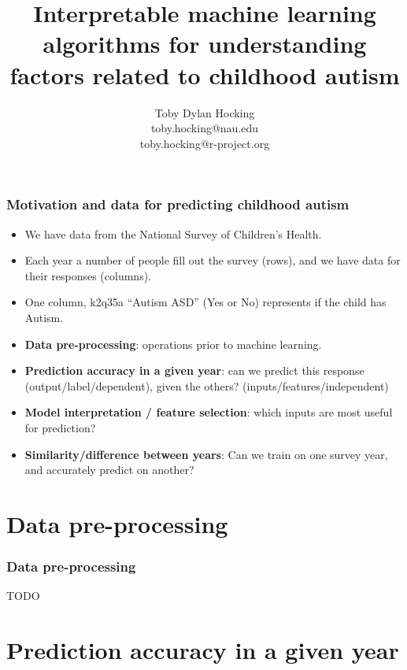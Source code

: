 \documentclass{beamer}
\begin{document}
\title{Interpretable machine learning algorithms for understanding factors related to childhood autism}

\author{
  Toby Dylan Hocking\\
  toby.hocking@nau.edu\\
  toby.hocking@r-project.org\\
}

\maketitle

\begin{frame}
  \frametitle{Motivation and data for predicting childhood autism}
  \begin{itemize}
  \item We have data from the National Survey of Children's Health.
  \item Each year a number of people fill out the survey (rows), and
    we have data for their responses (columns).
  \item One column, k2q35a ``Autism ASD'' (Yes or No) represents if
    the child has Autism.
  \item \textbf{Data pre-processing}: operations prior to machine
    learning.
  \item \textbf{Prediction accuracy in a given year}: can we predict
    this response (output/label/dependent), given the others?
    (inputs/features/independent)
  \item \textbf{Model interpretation / feature selection}: which
    inputs are most useful for prediction?
  \item \textbf{Similarity/difference between years}: Can we train
    on one survey year, and accurately predict on another?
  \end{itemize}
\end{frame}

\section{Data pre-processing}

\begin{frame}
  \frametitle{Data pre-processing}
  TODO
\end{frame}

\section{Prediction accuracy in a given year}
\end{document}

